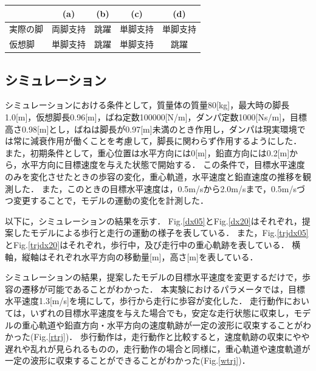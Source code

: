 \begin{table}[htbp]
 \centering
 \begin{tabular}{|l||c|c|c|c|} \hline
     & (a) & (b) & (c) & (d) \\ \hline \hline
    実際の脚 & 両脚支持 & 跳躍 & 単脚支持 & 単脚支持 \\
    仮想脚 & 単脚支持 & 跳躍 & 単脚支持 & 跳躍 \\
 \end{tabular}
\end{table}



\subsection{シミュレーション}

シミュレーションにおける条件として，質量体の質量80[kg]，最大時の脚長1.0[m]，仮想脚長0.96[m]，ばね定数100000[N/m]，ダンパ定数1000[Ns/m]，目標高さ0.98[m]とし，ばねは脚長が0.97[m]未満のとき作用し，ダンパは現実環境では常に減衰作用が働くことを考慮して，脚長に関わらず作用するようにした．
また，初期条件として，重心位置は水平方向には0[m]，鉛直方向には0.2[m]から，水平方向に目標速度を与えた状態で開始する．
この条件で，目標水平速度のみを変化させたときの歩容の変化，重心軌道，水平速度と鉛直速度の推移を観測した．
また，このときの目標水平速度は，0.5m/sから2.0m/sまで，0.5m/sづつ変更することで，モデルの運動の変化を計測した．

以下に，シミュレーションの結果を示す．
Fig.\ref{dx05}とFig.\ref{dx20}はそれぞれ，提案したモデルによる歩行と走行の運動の様子を表している．
また，Fig.\ref{trjdx05}とFig.\ref{trjdx20}はそれぞれ，歩行中，及び走行中の重心軌跡を表している．
横軸，縦軸はそれぞれ水平方向の移動量[m]，高さ[m]を表している．

シミュレーションの結果，提案したモデルの目標水平速度を変更するだけで，歩容の遷移が可能であることがわかった．
本実験におけるパラメータでは，目標水平速度1.3[m/s]を境にして，歩行から走行に歩容が変化した．
走行動作においては，いずれの目標水平速度を与えた場合でも，安定な走行状態に収束し，モデルの重心軌道や鉛直方向・水平方向の速度軌跡が一定の波形に収束することがわかった(Fig.\ref{rtrj})．
歩行動作は，走行動作と比較すると，速度軌跡の収束にやや遅れや乱れが見られるものの，走行動作の場合と同様に，重心軌道や速度軌道が一定の波形に収束することができることがわかった(Fig.\ref{wtrj})．




